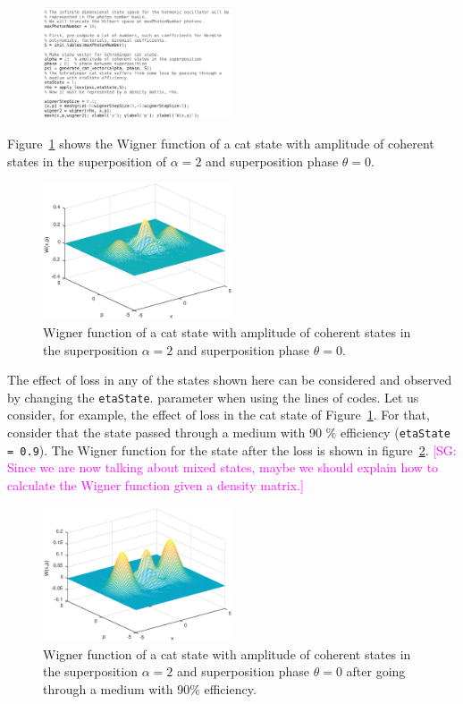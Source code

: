 \documentclass[twocolumn]{rbef}
\providecommand{\aucmnt}[1]{#1}
\providecommand{\editcolor}[2]{\textcolor{#1}{#2}}
\providecommand{\aucmnt}[1]{}
\providecommand{\editcolor}[2]{#2}
\newcommand{\SGc}[1]{\aucmnt{\editcolor{magenta}{[SG: #1]}}}
\begin{document}
\begin{figure}[h!]
\includegraphics[width=0.5\textwidth]{wigner-cat.eps}
\end{figure}

Figure~\ref{fig-catstate} shows the Wigner function of a cat state with amplitude of coherent states in the superposition of $\alpha=2$ and superposition phase $\theta =0$. 

\begin{figure}[h]
\includegraphics[width=0.5\textwidth]{wigner-cat-2.eps}
\caption{Wigner function of a cat state with amplitude of coherent states in the superposition $\alpha=2$ and superposition phase $\theta =0$.}
\label{fig-catstate}
\end{figure}

The effect of loss in any of the states shown here can be considered
and observed by changing the \texttt{etaState}. parameter when using
the lines of codes. Let us consider, for example, the effect of loss
in the cat state of Figure~\ref{fig-catstate}. For that, consider that
the state passed through a medium with 90 \% efficiency
(\texttt{etaState = 0.9}). The Wigner function for the state after the
loss is shown in figure~\ref{fig-catstate-loss}.  \SGc{Since we are
  now talking about mixed states, maybe we should explain how to
  calculate the Wigner function given a density matrix.}

\begin{figure}[h]
\includegraphics[width=0.5\textwidth]{wigner-cat-2-perda.eps}
\caption{Wigner function of a cat state with amplitude of coherent states in the superposition $\alpha=2$ and superposition phase $\theta =0$ after going through a medium with 90\% efficiency.}
\label{fig-catstate-loss}
\end{figure}
\end{document}
